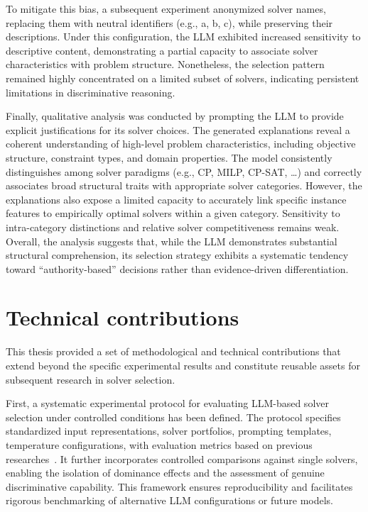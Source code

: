 \documentclass[../../main]{subfiles}
\begin{document}
To mitigate this bias, a subsequent experiment anonymized solver names, replacing them with neutral identifiers (e.g., a, b, c), while preserving their descriptions. Under this configuration, the LLM exhibited increased sensitivity to descriptive content, demonstrating a partial capacity to associate solver characteristics with problem structure. Nonetheless, the selection pattern remained highly concentrated on a limited subset of solvers, indicating persistent limitations in discriminative reasoning.

Finally, qualitative analysis was conducted by prompting the LLM to provide explicit justifications for its solver choices. The generated explanations reveal a coherent understanding of high-level problem characteristics, including objective structure, constraint types, and domain properties. The model consistently distinguishes among solver paradigms (e.g., CP, MILP, CP-SAT, \dots) and correctly associates broad structural traits with appropriate solver categories. However, the explanations also expose a limited capacity to accurately link specific instance features to empirically optimal solvers within a given category. Sensitivity to intra-category distinctions and relative solver competitiveness remains weak. Overall, the analysis suggests that, while the LLM demonstrates substantial structural comprehension, its selection strategy exhibits a systematic tendency toward ``authority-based'' decisions rather than evidence-driven differentiation.

\section{Technical contributions}
This thesis provided a set of methodological and technical contributions that extend beyond the specific experimental results and constitute reusable assets for subsequent research in solver selection.

First, a systematic experimental protocol for evaluating LLM-based solver selection under controlled conditions has been defined. The protocol specifies standardized input representations, solver portfolios, prompting templates, temperature configurations, with evaluation metrics based on previous researches~\cite{evaluationMetaSolvers}. It further incorporates controlled comparisons against single solvers, enabling the isolation of dominance effects and the assessment of genuine discriminative capability. This framework ensures reproducibility and facilitates rigorous benchmarking of alternative LLM configurations or future models.
\end{document}

